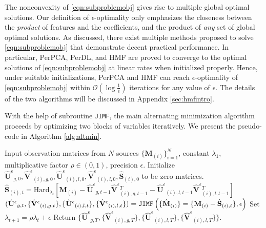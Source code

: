 \documentclass[twoside,11pt]{article}
\def\name{\texttt{TCMF}\xspace}
\def\inneralg{\texttt{JIMF}\xspace}
\newcommand{\hard}[2]{\text{Hard}_{#1}\left[#2\right]}
\newcommand{\matM}{\mathbf{M}}
\newcommand{\hmatM}{\hat{\mathbf{M}}}
\newcommand{\hmatS}{\hat{\mathbf{S}}}
\newcommand{\hmatUeps}{\hat{\mathbf{U}}^{\epsilon}{}}
\newcommand{\hmatVeps}{\hat{\mathbf{V}}^{\epsilon}{}}
\begin{document}
The nonconvexity of \eqref{eqn:subproblemobj} gives rise to multiple global optimal solutions. Our definition of $\epsilon$-optimality only emphasizes the closeness between the \textit{product} of features and the coefficients, and the product of \textit{any} set of global optimal solutions. As discussed, there exist multiple methods proposed to solve \eqref{eqn:subproblemobj} that demonstrate decent practical performance. In particular, PerPCA, PerDL, and HMF are proved to converge to the optimal solutions of \eqref{eqn:subproblemobj} at linear rates when initialized properly. Hence, under suitable initializations,  PerPCA and HMF can reach $\epsilon$-optimality of \eqref{eqn:subproblemobj} within $\mathcal{O}\left(\log\frac{1}{\epsilon}\right)$ iterations for any value of $\epsilon$. The details of the two algorithms will be discussed in Appendix \ref{sec:hmfintro}.


With the help of subroutine \inneralg, the main alternating minimization algorithm proceeds by optimizing two blocks of variables iteratively. We present the pseudo-code in Algorithm \ref{alg:altmin}.

\begin{algorithm}
\caption{\name: alternating minimization}
\label{alg:altmin}
\begin{algorithmic}[1]
\STATE Input observation matrices from $N$ sources $\{\matM_{(i)}\}_{i=1}^N$, constant $\lambda_1$, multiplicative factor $\rho \in (0,1)$, precision $\epsilon$.
\STATE Initialize $\hmatUeps_{g,0}, \hmatVeps_{(i),g,0},\hmatUeps_{(i),l,0},\hmatVeps_{(i),l,0},\hmatS_{(i),0}$ to be zero matrices.
\STATE $\hmatS_{(i),t}=\hard{\lambda_{t}}{\matM_{(i)}-\hmatUeps_{g,t-1}\hmatVeps_{(i),g,t-1}^T-\hmatUeps_{(i),l,t-1}\hmatVeps_{(i),l,t-1}^T}$
\ENDFOR
\STATE $(\hmatUeps_{g,t},\{\hmatVeps_{(i),g,t}\},\{\hmatUeps_{(i),l,t}\},\{\hmatVeps_{(i),l,t}\})=\text{\inneralg}\left(\{\hmatM_{(i)}\}=\{\matM_{(i)}-\hmatS_{(i),t}\},\epsilon\right)$
\STATE Set $\lambda_{t+1}=\rho \lambda_{t}+\epsilon$
\ENDFOR
\STATE Return $\{\hmatUeps_{g,T},\{\hmatVeps_{(i),g,T}\},\{\hmatUeps_{(i),l,T}\},\{\hmatVeps_{(i),l,T}\}\}$.
\end{algorithmic}
\end{algorithm}
\end{document}
